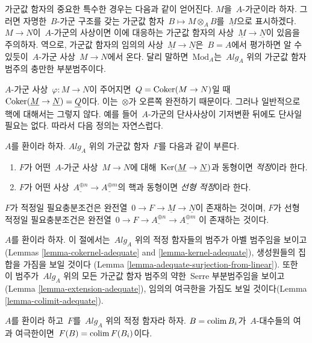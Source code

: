 \medskip\noindent
가군값 함자의 중요한 특수한 경우는 다음과 같이 얻어진다.
$M$을\  $A$-가군이라 하자. 그러면 자명한\  $B$-가군 구조를 갖는
가군값 함자\  $B \mapsto M \otimes_A B$를\  $\underline{M}$으로
표시하겠다. $M \to N$이\  $A$-가군의 사상이면 이에 대응하는
가군값 함자의 사상\  $\underline{M} \to \underline{N}$이 있음을
주의하자. 역으로, 가군값 함자의 임의의 사상\ 
$\underline{M} \to \underline{N}$은\  $B = A$에서 평가하면 알 수
있듯이\  $A$-가군 사상\  $M \to N$에서 온다. 달리 말하면\ 
$\text{Mod}_A$는\  $\textit{Alg}_A$ 위의 가군값 함자 범주의
충만한 부분범주이다.

\medskip\noindent
$A$-가군 사상\  $\varphi : M \to N$이 주어지면\ 
$Q = \mathop{\mathrm{Coker}}(M \to N)$일 때\ 
$\mathop{\mathrm{Coker}}(\underline{M} \to \underline{N}) =
\underline{Q}$이다. 이는\  $\otimes$가 오른쪽 완전하기 때문이다.
그러나 일반적으로 핵에 대해서는 그렇지 않다. 예를 들어\ 
$A$-가군의 단사사상이 기저변환 뒤에도 단사일 필요는 없다.
따라서 다음 정의는 자연스럽다.

\begin{definition}
\label{definition-adequate-functor}
$A$를 환이라 하자. $\textit{Alg}_A$ 위의 가군값 함자\  $F$를
다음과 같이 부른다.
\begin{enumerate}
\item $F$가 어떤\  $A$-가군 사상\  $M \to N$에 대해\ 
$\mathop{\mathrm{Ker}}(\underline{M} \to \underline{N})$과 동형이면
{\it 적정}이라 한다.
\item $F$가 어떤 사상\ 
$\underline{A^{\oplus n}} \to \underline{A^{\oplus m}}$의 핵과
동형이면 {\it 선형 적정}이라 한다.
\end{enumerate}
\end{definition}

\noindent
$F$가 적정일 필요충분조건은 완전열\ 
$0 \to F \to \underline{M} \to \underline{N}$이 존재하는 것이며,
$F$가 선형 적정일 필요충분조건은 완전열\ 
$0 \to F \to \underline{A^{\oplus n}} \to \underline{A^{\oplus m}}$
이 존재하는 것이다.

\medskip\noindent
$A$를 환이라 하자. 이 절에서는\  $\textit{Alg}_A$ 위의 적정
함자들의 범주가 아벨 범주임을 보이고
(Lemmas \ref{lemma-cokernel-adequate} and
\ref{lemma-kernel-adequate}), 생성원들의 집합을 가짐을 보일 것이다
(Lemma \ref{lemma-adequate-surjection-from-linear}).
또한 이 범주가\  $\textit{Alg}_A$ 위의 모든 가군값 함자 범주의
약한\  Serre 부분범주임을 보이고
(Lemma \ref{lemma-extension-adequate}), 임의의 여극한을 가짐도
보일 것이다(Lemma \ref{lemma-colimit-adequate}).

\begin{lemma}
\label{lemma-adequate-finite-presentation}
$A$를 환이라 하고\  $F$를\  $\textit{Alg}_A$ 위의 적정 함자라 하자.
$B = \mathop{\mathrm{colim}}\nolimits B_i$가\  $A$-대수들의 여과 여극한이면\ 
$F(B) = \mathop{\mathrm{colim}}\nolimits F(B_i)$이다.
\end{lemma}

